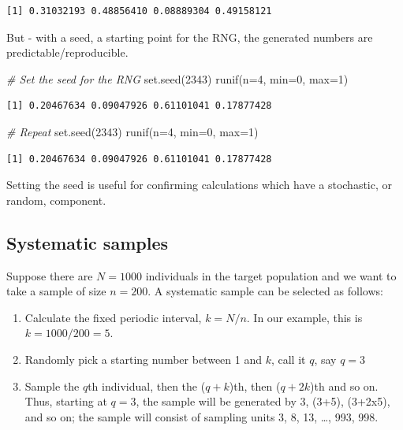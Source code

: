 \documentclass[
  oneside]{krantz}
\newenvironment{Shaded}{\begin{snugshade}}{\end{snugshade}}
\newcommand{\AttributeTok}[1]{\textcolor[rgb]{0.77,0.63,0.00}{#1}}
\newcommand{\CommentTok}[1]{\textcolor[rgb]{0.56,0.35,0.01}{\textit{#1}}}
\newcommand{\DecValTok}[1]{\textcolor[rgb]{0.00,0.00,0.81}{#1}}
\newcommand{\FunctionTok}[1]{\textcolor[rgb]{0.00,0.00,0.00}{#1}}
\newcommand{\NormalTok}[1]{#1}
\begin{document}
\begin{verbatim}
[1] 0.31032193 0.48856410 0.08889304 0.49158121
\end{verbatim}

But - with a seed, a starting point for the RNG, the generated numbers are predictable/reproducible.

\begin{Shaded}
\begin{Highlighting}[]
\CommentTok{\# Set the seed for the RNG}
\FunctionTok{set.seed}\NormalTok{(}\DecValTok{2343}\NormalTok{)}
\FunctionTok{runif}\NormalTok{(}\AttributeTok{n=}\DecValTok{4}\NormalTok{, }\AttributeTok{min=}\DecValTok{0}\NormalTok{, }\AttributeTok{max=}\DecValTok{1}\NormalTok{)}
\end{Highlighting}
\end{Shaded}

\begin{verbatim}
[1] 0.20467634 0.09047926 0.61101041 0.17877428
\end{verbatim}

\begin{Shaded}
\begin{Highlighting}[]
\CommentTok{\# Repeat}
\FunctionTok{set.seed}\NormalTok{(}\DecValTok{2343}\NormalTok{)}
\FunctionTok{runif}\NormalTok{(}\AttributeTok{n=}\DecValTok{4}\NormalTok{, }\AttributeTok{min=}\DecValTok{0}\NormalTok{, }\AttributeTok{max=}\DecValTok{1}\NormalTok{)}
\end{Highlighting}
\end{Shaded}

\begin{verbatim}
[1] 0.20467634 0.09047926 0.61101041 0.17877428
\end{verbatim}

Setting the seed is useful for confirming calculations which have a stochastic, or random, component.

\hypertarget{systematic-samples}{%
\subsection{Systematic samples}\label{systematic-samples}}

Suppose there are \(N=1000\) individuals in the target population and we want to take a sample of size \(n=200\). A systematic sample can be selected as follows:

\begin{enumerate}
\def\labelenumi{\arabic{enumi}.}
\item
  Calculate the fixed periodic interval, \(k = N/n\). In our example, this is \(k = 1000/200 = 5\).
\item
  Randomly pick a starting number between 1 and \(k\), call it \(q\), say \(q=3\)
\item
  Sample the \(q\)th individual, then the (\(q+k\))th, then (\(q+2k\))th and so on. Thus, starting at \(q=3\), the sample will be generated by 3, (3+5), (3+2x5), and so on; the sample will consist of sampling units 3, 8, 13, \ldots, 993, 998.
\end{enumerate}
\end{document}
